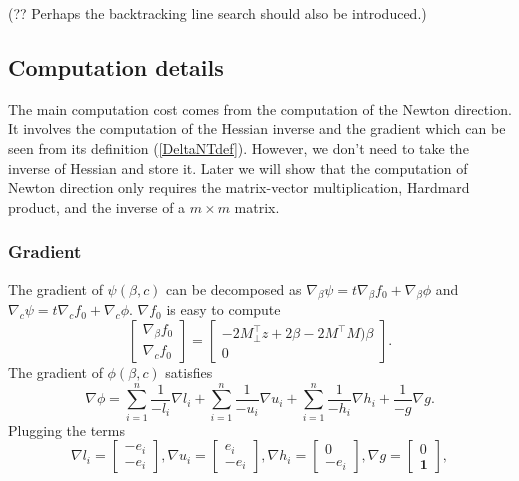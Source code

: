 \documentclass[final,onefignum,onetabnum]{siamart190516}
\begin{document}
(?? Perhaps the backtracking line search should also be introduced.)
\subsection{Computation details}
The main computation cost comes from the computation of the Newton direction. It involves the computation of the Hessian inverse and the gradient which can be seen from its definition (\ref{DeltaNTdef}). However, we don't need to take the inverse of Hessian and store it. Later we will show that the computation of Newton direction only requires the matrix-vector multiplication, Hardmard product, and the inverse of a $m\times m$ matrix.
\subsubsection{Gradient}
The gradient of $\psi(\beta,c)$ can be decomposed as $\nabla_{\beta}\psi = t\nabla_{\beta} f_0 + \nabla_{\beta}\phi$ and $\nabla_{c}\psi = t\nabla_{c} f_0 + \nabla_{c}\phi$. $\nabla f_0$ is easy to compute
\begin{equation}
    \begin{bmatrix}
    \nabla_{\beta} f_0\\
    \nabla_{c} f_0
    \end{bmatrix} = \begin{bmatrix}-2M_{\perp}^\top z + 2\beta - 2 M^\top M)\beta\\ 0\end{bmatrix}.
\end{equation}
The gradient of $\phi(\beta,c)$ satisfies
\begin{equation}
    \nabla \phi = \sum_{i=1}^n\frac{1}{-l_i}\nabla l_i + \sum_{i=1}^n\frac{1}{-u_i}\nabla u_i + \sum_{i=1}^n\frac{1}{-h_i}\nabla h_i + \frac{1}{-g}\nabla g.
\end{equation}
Plugging the terms
\begin{equation}
     \nabla l_i = \begin{bmatrix}-e_i\\-e_i\end{bmatrix}, 
    \nabla u_i = \begin{bmatrix}e_i\\-e_i\end{bmatrix},
    \nabla h_i = \begin{bmatrix}0\\-e_i\end{bmatrix},
    \nabla g = \begin{bmatrix}0\\\mathbf{1}\end{bmatrix},
\end{equation}
\end{document}
